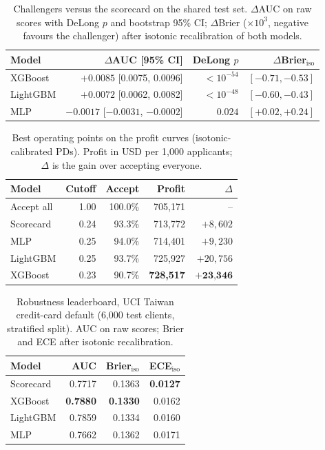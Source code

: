 \documentclass[a4paper,twocolumn,10pt]{article}
\begin{document}
\begin{table}[t]
\centering
\caption{Challengers versus the scorecard on the shared test set. $\Delta$AUC on raw scores with DeLong $p$ and bootstrap 95\% CI; $\Delta$Brier ($\times 10^{3}$, negative favours the challenger) after isotonic recalibration of both models.}
\label{tab:significance}
\small
\begin{tabular}{lrrr}
\toprule
Model & $\Delta$AUC [95\% CI] & DeLong $p$ & $\Delta$Brier$_{\text{iso}}$ \\
\midrule
XGBoost  & $+0.0085$ [0.0075, 0.0096] & $<10^{-54}$ & $[-0.71, -0.53]$ \\
LightGBM & $+0.0072$ [0.0062, 0.0082] & $<10^{-48}$ & $[-0.60, -0.43]$ \\
MLP      & $-0.0017$ [$-0.0031$, $-0.0002$] & $0.024$ & $[+0.02, +0.24]$ \\
\bottomrule
\end{tabular}
\end{table}

\begin{table}[t]
\centering
\caption{Best operating points on the profit curves (isotonic-calibrated PDs). Profit in USD per 1{,}000 applicants; $\Delta$ is the gain over accepting everyone.}
\label{tab:profit}
\small
\begin{tabular}{lrrrr}
\toprule
Model & Cutoff & Accept & Profit & $\Delta$ \\
\midrule
Accept all & 1.00 & 100.0\% & 705{,}171 & -- \\
Scorecard  & 0.24 & 93.3\%  & 713{,}772 & $+8{,}602$ \\
MLP        & 0.25 & 94.0\%  & 714{,}401 & $+9{,}230$ \\
LightGBM   & 0.25 & 93.7\%  & 725{,}927 & $+20{,}756$ \\
XGBoost    & 0.23 & 90.7\%  & \textbf{728{,}517} & $+\textbf{23{,}346}$ \\
\bottomrule
\end{tabular}
\end{table}

\begin{table}[t]
\centering
\caption{Robustness leaderboard, UCI Taiwan credit-card default (6{,}000 test clients, stratified split). AUC on raw scores; Brier and ECE after isotonic recalibration.}
\label{tab:taiwan}
\small
\begin{tabular}{lrrr}
\toprule
Model & AUC & Brier$_{\text{iso}}$ & ECE$_{\text{iso}}$ \\
\midrule
Scorecard & 0.7717 & 0.1363 & \textbf{0.0127} \\
XGBoost   & \textbf{0.7880} & \textbf{0.1330} & 0.0162 \\
LightGBM  & 0.7859 & 0.1334 & 0.0160 \\
MLP       & 0.7662 & 0.1362 & 0.0171 \\
\bottomrule
\end{tabular}
\end{table}
\end{document}

